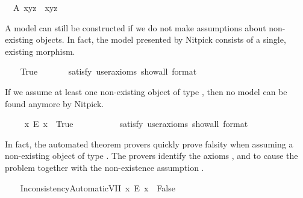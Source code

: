 \begin{isabellebody}
\ \ A{}{\isacharcolon}\ {\isachardoublequoteopen}x{\isasymcdot}{\isacharparenleft}y{\isasymcdot}z{\isacharparenright}\ {\isasymcong}\ {\isacharparenleft}x{\isasymcdot}y{\isacharparenright}{\isasymcdot}z{\isachardoublequoteclose}%
\begin{isamarkuptext}%
A model can still be constructed if we do not make assumptions about non-existing
  objects. In fact, the model presented by Nitpick consists of a single, existing morphism.%
\end{isamarkuptext}\isamarkuptrue%
\ \ \isamarkupfalse%
\ True\ \isanewline
\ \ \ \ \isamarkupfalse%
\ {\isacharbrackleft}satisfy{\isacharcomma}\ user{\isacharunderscore}axioms{\isacharcomma}\ show{\isacharunderscore}all{\isacharcomma}\ format\ {\isacharequal}\ {}{\isacharbrackright}%
\isadelimproof
\ %
\endisadelimproof
%
\isatagproof
{}\isamarkupfalse%
\ %
%
\endisatagproof
{\isafoldproof}%
%
\isadelimproof
%
\endisadelimproof
%
\begin{isamarkuptext}%
If we assume at least one non-existing object of type , then no model 
 can be found anymore by Nitpick.%
\end{isamarkuptext}\isamarkuptrue%
\ \ \isamarkupfalse%
\ \ {\isachardoublequoteopen}{\isasymexists}x{\isachardot}\ \isactrlbold {\isasymnot}{\isacharparenleft}E\ x{\isacharparenright}{\isachardoublequoteclose}\ \ True\ \ \ %
\ \isanewline
\ \ \ \ \isamarkupfalse%
\ {\isacharbrackleft}satisfy{\isacharcomma}\ user{\isacharunderscore}axioms{\isacharcomma}\ show{\isacharunderscore}all{\isacharcomma}\ format\ {\isacharequal}\ {}{\isacharbrackright}%
\isadelimproof
\ %
\endisadelimproof
%
\isatagproof
{}\isamarkupfalse%
%
\endisatagproof
{\isafoldproof}%
%
\isadelimproof
%
\endisadelimproof
%
\begin{isamarkuptext}%
In fact, the automated theorem provers quickly prove falsity when assuming a 
 non-existing object of type . The provers identify the axioms , 
 and  to cause the problem together with the non-existence assumption .%
\end{isamarkuptext}\isamarkuptrue%
\ \ \isamarkupfalse%
\ InconsistencyAutomaticVII{\isacharcolon}\ {\isachardoublequoteopen}{\isacharparenleft}{\isasymexists}x{\isachardot}\ \isactrlbold {\isasymnot}{\isacharparenleft}E\ x{\isacharparenright}{\isacharparenright}\ \isactrlbold {\isasymrightarrow}\ False{\isachardoublequoteclose}\ \isanewline

\end{isabellebody}

